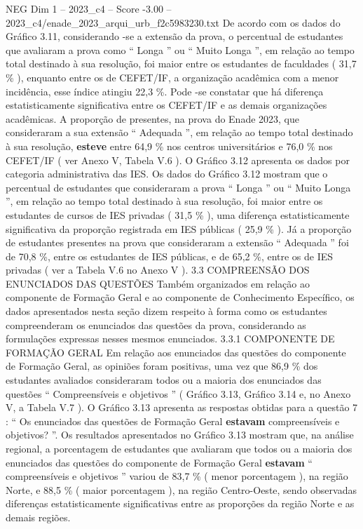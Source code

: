 \begin{textsample}{NEG Dim 1 – 2023\_c4 – Score -3.00 – 2023\_c4/enade\_2023\_arqui\_urb\_f2c5983230.txt}
De acordo com os dados do Gráfico 3.11, considerando -se a extensão da prova, o percentual de estudantes que avaliaram a prova como “ Longa ” ou “ Muito Longa ”, em relação ao tempo total destinado à sua resolução, foi maior entre os estudantes de faculdades ( 31,7 \% ), enquanto entre os de CEFET/IF, a organização acadêmica com a menor incidência, esse índice atingiu 22,3 \%.
Pode -se constatar que há diferença estatisticamente significativa entre os CEFET/IF e as demais organizações acadêmicas.
A proporção de presentes, na prova do Enade 2023, que consideraram a sua extensão “ Adequada ”, em relação ao tempo total destinado à sua resolução, \textbf{esteve} entre 64,9 \% nos centros universitários e 76,0 \% nos CEFET/IF ( ver Anexo V, Tabela V.6 ).
O Gráfico 3.12 apresenta os dados por categoria administrativa das IES.
Os dados do Gráfico 3.12 mostram que o percentual de estudantes que consideraram a prova “ Longa ” ou “ Muito Longa ”, em relação ao tempo total destinado à sua resolução, foi maior entre os estudantes de cursos de IES privadas ( 31,5 \% ), uma diferença estatisticamente significativa da proporção registrada em IES públicas ( 25,9 \% ).
Já a proporção de estudantes presentes na prova que consideraram a extensão “ Adequada ” foi de 70,8 \%, entre os estudantes de IES públicas, e de 65,2 \%, entre os de IES privadas ( ver a Tabela V.6 no Anexo V ). 3.3 COMPREENSÃO DOS ENUNCIADOS DAS QUESTÕES Também organizados em relação ao componente de Formação Geral e ao componente de Conhecimento Específico, os dados apresentados nesta seção dizem respeito à forma como os estudantes compreenderam os enunciados das questões da prova, considerando as formulações expressas nesses mesmos enunciados. 3.3.1 COMPONENTE DE FORMAÇÃO GERAL Em relação aos enunciados das questões do componente de Formação Geral, as opiniões foram positivas, uma vez que 86,9 \% dos estudantes avaliados consideraram todos ou a maioria dos enunciados das questões “ Compreensíveis e objetivos ” ( Gráfico 3.13, Gráfico 3.14 e, no Anexo V, a Tabela V.7 ).
O Gráfico 3.13 apresenta as respostas obtidas para a questão 7 : “ Os enunciados das questões de Formação Geral \textbf{estavam} compreensíveis e objetivos? ”.
Os resultados apresentados no Gráfico 3.13 mostram que, na análise regional, a porcentagem de estudantes que avaliaram que todos ou a maioria dos enunciados das questões do componente de Formação Geral \textbf{estavam} “ compreensíveis e objetivos ” variou de 83,7 \% ( menor porcentagem ), na região Norte, e 88,5 \% ( maior porcentagem ), na região Centro-Oeste, sendo observadas diferenças estatisticamente significativas entre as proporções da região Norte e as demais regiões.

\end{textsample}
